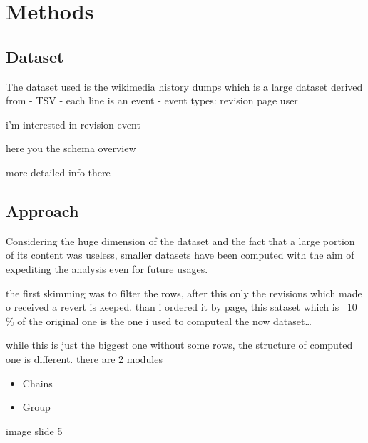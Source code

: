 \chapter{Methods}
\label{cha:methods}
\section{Dataset }
The dataset used is the wikimedia history dumps which is a large dataset derived from 
- TSV 
- each line is an event
- event types: revision page user 

i'm interested in revision event 

here you the schema overview 

more detailed info there 


\section{Approach}
Considering the huge dimension of the dataset and the fact that a large portion of its content was useless, 
smaller datasets have been computed with the aim of expediting the analysis even for future usages.

the first skimming was to filter the rows, after this only the revisions which made o received a revert is keeped.
than i ordered it by page, this sataset which is ~10 \% of the original one is the one i used to computeal the now dataset\dots

while this is just the biggest one without some rows, the structure of computed one is different. there are 2 modules
\begin{itemize}
    \item Chains
    \item Group 
\end{itemize}

image slide 5 

